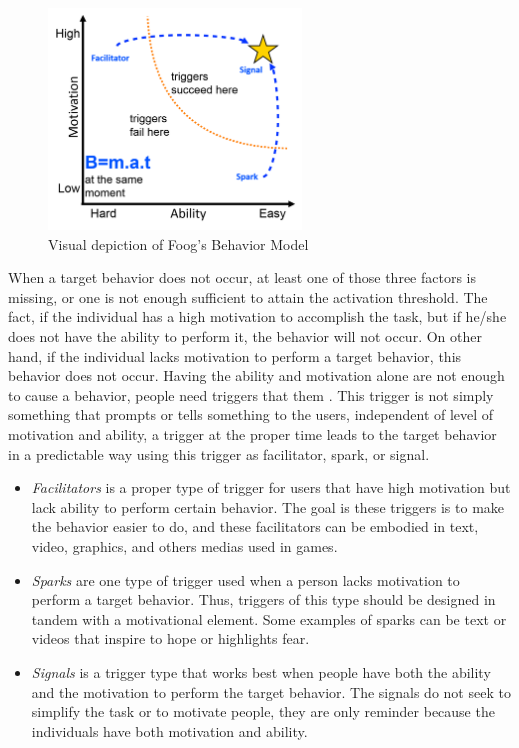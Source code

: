 \begin{figure}[htb]
 \caption{Visual depiction of Foog's Behavior Model}
 \label{fig:foggs-behavior-model}
 \centering
 \includegraphics[width=0.6\textwidth]{images/chap-general-background/foggs-behavior-model.png}
\end{figure}

When a target behavior does not occur, at least one of those three factors is missing, or one is not enough sufficient to attain the activation threshold.
The fact, if the individual has a high motivation to accomplish the task, but if he/she does not have the ability to perform it, the behavior will not occur.
On other hand, if the individual lacks motivation to perform a target behavior, this behavior does not occur.
Having the ability and motivation alone are not enough to cause a behavior, people need triggers that them  \cite{Fogg2009}. This trigger is not simply something that prompts or tells something to the users, independent of level of motivation and ability, a trigger at the proper time leads to the target behavior in a predictable way using this trigger as facilitator, spark, or signal.

\begin{itemize}
\item \emph{Facilitators} is a proper type of trigger for users that have high motivation but lack ability to perform certain behavior. The goal is these triggers is to make the behavior easier to do, and these facilitators can be embodied in text, video, graphics, and others medias used in games.
\item \emph{Sparks} are one type of trigger used when a person lacks motivation to perform a target behavior. Thus, triggers of this type should be designed in tandem with a motivational element. Some examples of sparks can be text or videos that inspire to hope or highlights fear.
\item \emph{Signals} is a trigger type that works best when people have both the ability and the motivation to perform the target behavior. The signals do not seek to simplify the task or to motivate people, they are only reminder because the individuals have both motivation and ability.
\end{itemize}

